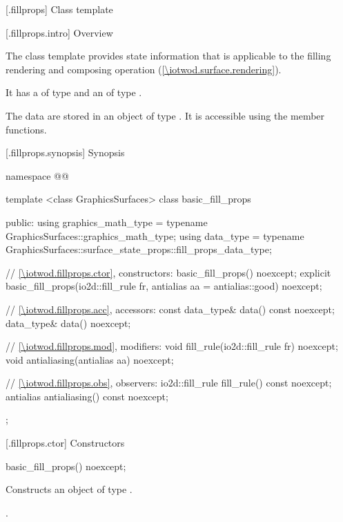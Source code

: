 
 [\iotwod.fillprops] {Class template }

 [\iotwod.fillprops.intro] {Overview}

\pnum
The  class template provides state information that is applicable to the filling rendering and composing operation (\ref{\iotwod.surface.rendering}).

\pnum
It has a  of type  and an  of type .

\pnum
The data are stored in an object of type . It is accessible using the  member functions.

 [\iotwod.fillprops.synopsis] {Synopsis}

\begin{codeblock}
namespace @\fullnamespace{}@ {
  template <class GraphicsSurfaces>
  class basic_fill_props {
  public:
    using graphics_math_type = typename GraphicsSurfaces::graphics_math_type;
    using data_type =
      typename GraphicsSurfaces::surface_state_props::fill_props_data_type;

    // \ref{\iotwod.fillprops.ctor}, constructors:
    basic_fill_props() noexcept;
    explicit basic_fill_props(io2d::fill_rule fr,
      antialias aa = antialias::good) noexcept;
    
    // \ref{\iotwod.fillprops.acc}, accessors:
    const data_type& data() const noexcept;
    data_type& data() noexcept;

    // \ref{\iotwod.fillprops.mod}, modifiers:
    void fill_rule(io2d::fill_rule fr) noexcept;
    void antialiasing(antialias aa) noexcept;

    // \ref{\iotwod.fillprops.obs}, observers:
    io2d::fill_rule fill_rule() const noexcept;
    antialias antialiasing() const noexcept;
  };
}
\end{codeblock}

 [\iotwod.fillprops.ctor] {Constructors}

\begin{itemdecl}
basic_fill_props() noexcept;
\end{itemdecl}
\begin{itemdescr}
\pnum
\effects
Constructs an object of type .

\pnum
\postconditions
{}.
\end{itemdescr}

